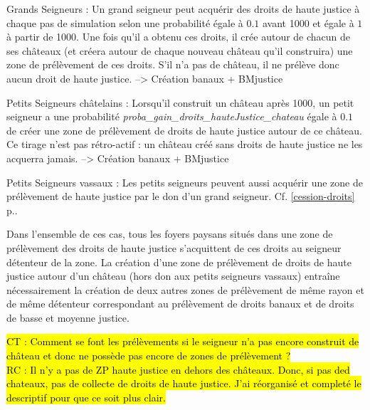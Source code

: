 \documentclass[a4paper,11pt]{article}
\newcommand{\hlc}[2][yellow]{ {\sethlcolor{#1} \hl{#2}} }
\begin{document}
{\begin{itemize}
	\item Grands Seigneurs : Un grand seigneur peut acquérir des droits de haute justice à chaque pas de simulation selon une probabilité égale à $0.1$ avant 1000 et égale à $1$ à partir de 1000.
	Une fois qu'il a obtenu ces droits, il crée autour de chacun de ses châteaux (et créera autour de chaque nouveau château qu'il construira) une zone de prélèvement de ces droits. S'il n'a pas de château, il ne prélève donc aucun droit de haute justice. --> Création banaux + BMjustice
	\begin{sloppypar} %
	\item Petits Seigneurs châtelains : Lorsqu'il construit un château après 1000, un petit seigneur a une probabilité  \textit{proba\_gain\_droits\_hauteJustice\_chateau} égale à $0.1$ de créer une zone de prélèvement de droits de haute justice autour de ce château. Ce tirage n'est pas rétro-actif : un château créé sans droits de haute justice ne les acquerra jamais. --> Création banaux + BMjustice
	\end{sloppypar}
	\item Petits Seigneurs vassaux : Les petits seigneurs peuvent aussi acquérir une zone de prélèvement de haute justice par le don d'un grand seigneur. Cf. \ref{cession-droits} p.\pageref{cession-droits}.
\end{itemize}

Dans l'ensemble de ces cas, tous les foyers paysans situés dans une zone de prélèvement des droits de haute justice s'acquittent de ces droits au seigneur détenteur de la zone.
La création d'une zone de prélèvement de droits de haute justice autour d'un château (hors don aux petits seigneurs vassaux) entraîne nécessairement la création de deux autres zones de prélèvement de même rayon et de même détenteur correspondant au prélèvement de droits banaux et de droits de basse et moyenne justice.


\hlc[fluorescentorange]{CT : Comment se font les prélèvements si le seigneur n'a pas encore construit de château et donc ne possède pas encore de zones de prélèvement ?\\
RC : Il n'y a pas de ZP haute justice en dehors des châteaux. Donc, si pas ded chateaux, pas de collecte de droits de haute justice. J'ai réorganisé et completé le descriptif pour que ce soit plus clair.}\\




}
\end{document}
